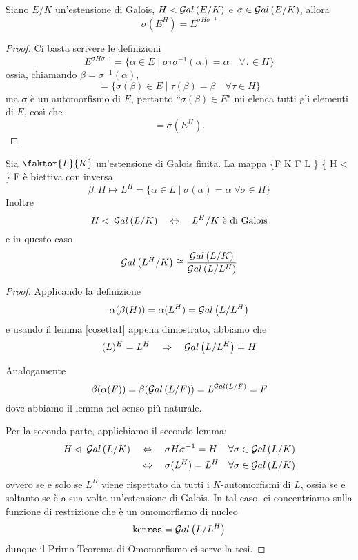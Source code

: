 \begin{multicols}{2}
	\begin{prop}
		Siano $ E/K $ un'estensione di Galois, $ H < \mathcal{G}al\left( E/K \right) $ e $ \sigma \in \mathcal{G}al\left( E/K \right) $, allora
		\[ \sigma (E^H) = E^{\sigma H \sigma^{-1}} \]
	\end{prop}
	\begin{proof}
		Ci basta scrivere le definizioni
		\[ E^{\sigma H \sigma^{-1}} = \{ \alpha \in E \mid \sigma\tau\sigma^{-1}(\alpha) = \alpha \quad\forall \tau \in H \} \]
		ossia, chiamando $ \beta = \sigma^{-1}(\alpha) $,
		\[ = \{ \sigma(\beta) \in E \mid \tau(\beta) = \beta \quad\forall \tau \in H \} \]
		ma $ \sigma $ è un automorfismo di $ E $, pertanto \textquotedblleft$ \sigma(\beta) \in E $" mi elenca tutti gli elementi di $ E $, così che
		\[ = \sigma(E^H). \]
	\end{proof}
	
	\begin{theorem}[di corrispondenza]\label{corrgall}
		Sia $ \faktor{L}{K} $ un'estensione di Galois finita. La mappa
		\fun{\alpha}
		{\{F  \mid K \subseteq F \subseteq L \}}
		{\left\{ H <  \right\}}
		{F}
		{}
		è biettiva con inversa
		\[ \beta: H \mapsto L^H = \{ \alpha \in L \mid \sigma(\alpha) = \alpha \;\forall \sigma \in H \} \]
		Inoltre
		\[ H \lhd\; \mathcal{G}al\left( L/K \right) \quad\Leftrightarrow\quad L^H/K \text{ è di Galois} \]
		e in questo caso
		\[ \mathcal{G}al\left( L^H/K \right) \cong \dfrac{\mathcal{G}al\left( L/K \right)}{\mathcal{G}al\left( L/L^H \right)} \]
		
	\end{theorem}
	\begin{proof}
	Applicando la definizione
	\[ \alpha(\beta(H)) = \alpha(L^H) = \mathcal{G}al\left( L/L^H \right) \]
	e usando il lemma \ref{cosetta1} appena dimostrato, abbiamo che
	\[ (L)^H = L^H \quad\Rightarrow\quad \mathcal{G}al\left( L/L^H \right) = H \]
	
	Analogamente
	\[ \beta(\alpha(F)) = \beta(\mathcal{G}al\left( L/F \right)) = L^{\mathcal{G}al\left( L/F \right)} = F \]
	dove abbiamo il lemma nel senso più naturale.
	
	
	Per la seconda parte, applichiamo il secondo lemma:
	\begin{align*}
		H \lhd\; \mathcal{G}al\left( L/K \right) &\quad\Leftrightarrow\quad \sigma H \sigma^{-1} = H & \forall\sigma \in \mathcal{G}al\left( L/K \right) \\
		& \quad\Leftrightarrow\quad \sigma( L^H) = L^H & \forall\sigma \in \mathcal{G}al\left( L/K \right)
	\end{align*}
	ovvero se e solo se $ L^H $ viene rispettato da tutti i $ K $-automorfismi di $ L $, ossia se e soltanto se è a sua volta un'estensione di Galois. In tal caso, ci concentriamo sulla funzione di restrizione
	che è un omomorfismo di nucleo
	\[ \ker \texttt{res} = \mathcal{G}al\left( L/L^H \right) \]
	dunque il Primo Teorema di Omomorfismo ci serve la tesi.
	\end{proof}
	
	
\end{multicols}

